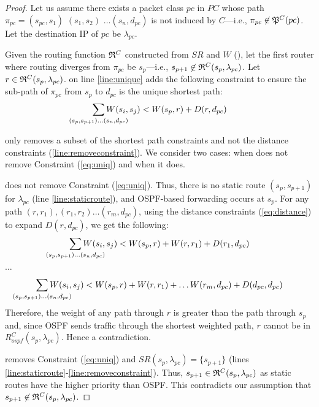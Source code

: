 \begin{proof}
Let us assume there exists a packet class $pc$ in $PC$ whose path $\pi_{pc} =
(s_{pc}, s_1)$ $ (s_1, s_2)$ 
$\ldots (s_n, d_{pc})$ is not induced by $C$---i.e.,
$\pi_{pc} \not\in \mathfrak{P}^C(pc)$. Let the destination IP of $pc$ be
$\lambda_{pc}$.

Given the routing function $\mathfrak{R}^C$ constructed from $SR$ and
$W$ (), let the first router where routing diverges from $\pi_{pc}$ be $s_p$---i.e.,  
$s_{p+1} \not\in \mathfrak{R}^C(s_{p}, \lambda_{pc})$. Let  $r \in \mathfrak{R}^C(s_{p}, \lambda_{pc})$.  
 on line \ref{line:unique} adds the following
constraint to ensure the sub-path of $\pi_{pc}$ 
from $s_{p}$ to $d_{pc}$ is the unique shortest path: 
\begin{equation} \label{eq:uniq}
\sum_{\mathclap{\substack{(s_{p},s_{p+1})\ldots(s_{n},d_{pc})}}} 
W(s_i, s_j) < W(s_{p}, r) + D(r, d_{pc})
\end{equation}

only removes a subset of the shortest path 
constraints and 
not the distance constraints (\ref{line:removeconstraint}). We consider 
two cases: when 
does not remove Constraint (\ref{eq:uniq}) and when it does. 

 does not remove Constraint (\ref{eq:uniq}). 
Thus, there is no static route $(s_p, s_{p+1})$ for
$\lambda_{pc}$ (line \ref{line:staticroute}), and 
OSPF-based forwarding occurs at $s_{p}$. 
For any path $(r, r_1), (r_1, r_2) \ldots (r_m, d_{pc})$, 
using the distance constraints (\ref{eq:distance}) to
expand $D(r, d_{pc})$, we get the following: 
\[
\sum_{\mathclap{\substack{(s_{p},s_{p+1})\ldots(s_{n},d_{pc})}}} 
W(s_i, s_j) < W(s_{p}, r) + W(r, r_{1}) + D(r_{1}, d_{pc})
\]
\begin{center}
	$\ldots$
\end{center}
\[
\sum_{\mathclap{\substack{(s_{p},s_{p+1})\ldots(s_{n},d_{pc})}}} 
W(s_i, s_j) < W(s_{p}, r) + W(r, r_{1}) + \ldots W(r_{m}, d_{pc}) + D(d_{pc}, d_{pc})
\]
Therefore, the weight of any path through $r$ is greater than 
the path through $s_{p}$ and, since
OSPF sends traffic through the shortest weighted
path, $r$ cannot be in $R^C_{ospf}(s_p, \lambda_{pc})$.
Hence a contradiction. 

 removes Constraint (\ref{eq:uniq}) 
and $SR(s_p, \lambda_{pc}) = \{s_{p+1}\}$ (lines \ref{line:staticroute}-\ref{line:removeconstraint}). 
Thus, $s_{p+1} \in \mathfrak{R}^C(s_{p}, \lambda_{pc})$ as static routes 
have the higher priority than OSPF. This contradicts our assumption
that $s_{p+1} \not\in \mathfrak{R}^C(s_{p}, \lambda_{pc})$. 
\end{proof}
